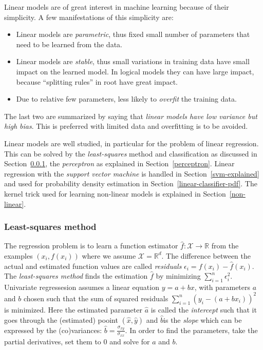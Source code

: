 Linear models are of great interest in machine learning because of their simplicity.
A few manifestations of this simplicity are:
\begin{itemize}
  \item Linear models are \emph{parametric}, thus fixed small number of parameters that need to be learned from the data.
  \item Linear models are \emph{stable}, thus small variations in training data have small impact on the learned model. In logical models they can have large impact, because ``splitting rules'' in root have great impact.
  \item Due to relative few parameters, less likely to \emph{overfit} the training data.
\end{itemize}

The last two are summarized by saying that \emph{linear models have low variance but high bias}.
This is preferred with limited data and overfitting is to be avoided.

Linear models are well studied, in particular for the problem of linear regression.
This can be solved by the \emph{least-squares} method and classification as discussed in Section~\ref{least-squares}, the \emph{perceptron} as explained in Section~\ref{perceptron}.
Linear regression with the \emph{support vector machine} is handled in Section~\ref{svm-explained} and used for probability density estimation in Section~\ref{linear-classifier-pdf}.
The kernel trick used for learning non-linear models is explained in Section~\ref{non-linear}.


\subsubsection{Least-squares method}\label{least-squares}
The regression problem is to learn a function estimator $\hat{f}:\mathcal{X} \to \mathbb{R}$ from the examples $(x_i, f(x_i))$ where we assume $\mathcal{X} = \mathbb{R}^d$.
The difference between the actual and estimated function values are called \emph{residuals} $\epsilon_i = f(x_i) - \hat{f}(x_i)$.
The \emph{least-squares method} finds the estimation $\hat{f}$ by minimizing $\sum_{i=1}^{n} \epsilon_i^2$.
Univariate regressesion assumes a linear equation $y = a + b x$, with parameters $a$ and $b$ chosen such that the sum of squared residuals $\sum_{i=1}^{n} (y_i - (a + b x_i))^2$ is minimized.
Here the estimated parameter $\hat{a}$ is called the \emph{intercept} such that it goes through the (estimated) pooint $(\hat{x},\hat{y})$ and $\hat{b}$is the \emph{slope} which can be expressed by the (co)variances: $\hat{b} = \frac{\sigma_{xy}}{\sigma_{xx}}$.
In order to find the parameters, take the partial derivatives, set them to $0$ and solve for $a$ and $b$.


